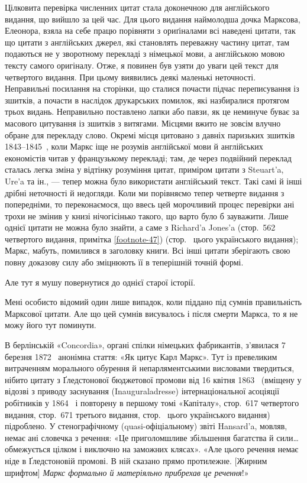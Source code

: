 Цілковита перевірка численних цитат стала доконечною для
англійського видання, що вийшло за цей час. Для цього видання
наймолодша дочка Марксова, Елеонора, взяла на себе працю
порівняти з ориґіналами всі наведені цитати, так що цитати
з англійських джерел, які становлять переважну частину цитат,
там подаються не у зворотному перекладі з німецької мови, а
англійською мовою тексту самого оригіналу. Отже, я повинен був
узяти до уваги цей текст для четвертого видання. При цьому виявились
деякі маленькі неточності. Неправильні посилання на сторінки,
що сталися почасти підчас переписування із зшитків, а почасти
в наслідок друкарських помилок, які назбиралися протягом
трьох видань. Неправильно поставлено лапки або павзи, як це
неминуче буває за масового цитування із зшитків з витягами.
Місцями вжито не зовсім влучно обране для перекладу слово.
Окремі місця цитовано з давніх паризьких зшитків 1843--1845~,
коли Маркс іще не розумів англійської мови й англійських економістів
читав у французькому перекладі; там, де через подвійний
переклад сталась легка зміна у відтінку розуміння цитат, приміром
цитати з Steuart’a, Ure’a та ін., — тепер можна було використати
англійський текст. Такі самі й інші дрібні неточності й недогляди.
Коли ми порівняємо тепер четверте видання з попередніми, то
переконаємося, що ввесь цей морочливий процес перевірки ані
трохи не змінив у книзі нічогісінько такого, що варто було б
зауважити. Лише однієї цитати не можна було знайти, а саме
з Richard’a Jones’a (стор.~562 четвертого видання, примітка \ref{footnote-47})
(стор.~\pageref{footnote-47} цього українського видання); Маркс, мабуть, помилився
в заголовку книги. Всі інші цитати зберігають свою повну
доказову силу або зміцнюють її в теперішній точній формі.

Але тут я мушу повернутися до однієї старої історії.

Мені особисто відомий один лише випадок, коли піддано під
сумнів правильність Марксової цитати. Але що цей сумнів висувалось
і після смерти Маркса, то я не можу його тут поминути.

В берлінській «Concordia», органі спілки німецьких фабрикантів,
з’явилася 7 березня 1872~ анонімна стаття: «Як цитує
Карл Маркс». Тут із превеликим витраченням морального обурення
й непарляментськими висловами твердиться, нібито цитату
з Ґледстонової бюджетової промови від 16 квітня 1863~
(вміщену у відозві з приводу заснування (Inauguraladresse) інтернаціональної
асоціяції робітників у 1864~ і повторену в першому
томі «Капіталу», стор.~617 четвертого видання, стор.~671 третього
видання, стор.~\pageref{footnote-105} цього українського видання) підроблено.
У стенографічному (quasi-офіціальному) звіті Hansard’a,
мовляв, немає ані словечка з речення: «Це приголомшливе збільшення
багатства й сили\dots{} обмежується цілком і виключно на
заможних клясах». «Але цього речення немає ніде в Ґледстоновій
промові. В ній сказано прямо протилежне. [Жирним
шрифтом] \emph{Маркс формально й матеріяльно прибрехав це речення}!»

